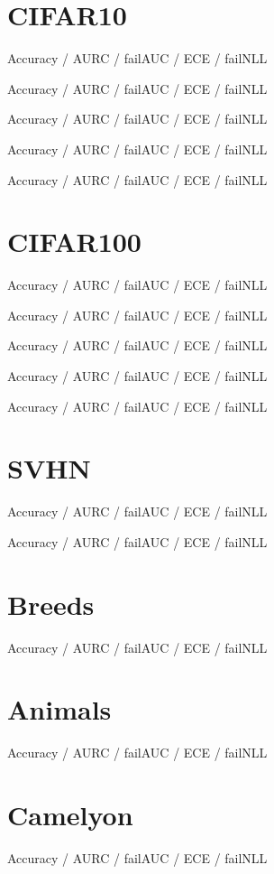 \documentclass{article}
\begin{document}
    \section{CIFAR10}
    Accuracy / AURC / failAUC / ECE / failNLL

    
    \pagebreak

    Accuracy / AURC / failAUC / ECE / failNLL

    
    \pagebreak

    Accuracy / AURC / failAUC / ECE / failNLL

    
    \pagebreak

    Accuracy / AURC / failAUC / ECE / failNLL

    
    \pagebreak

    Accuracy / AURC / failAUC / ECE / failNLL

    
    \pagebreak

    \section{CIFAR100}
    Accuracy / AURC / failAUC / ECE / failNLL

    
    \pagebreak

    Accuracy / AURC / failAUC / ECE / failNLL

    
    \pagebreak

    Accuracy / AURC / failAUC / ECE / failNLL

    
    \pagebreak

    Accuracy / AURC / failAUC / ECE / failNLL

    
    \pagebreak

    Accuracy / AURC / failAUC / ECE / failNLL

    
    \pagebreak

    \section{SVHN}
    Accuracy / AURC / failAUC / ECE / failNLL

    
    \pagebreak

    Accuracy / AURC / failAUC / ECE / failNLL

    
    \pagebreak

    \section{Breeds}
    Accuracy / AURC / failAUC / ECE / failNLL

    
    \pagebreak

    \section{Animals}
    Accuracy / AURC / failAUC / ECE / failNLL

    
    \pagebreak

    \section{Camelyon}
    Accuracy / AURC / failAUC / ECE / failNLL

    
\end{document}
